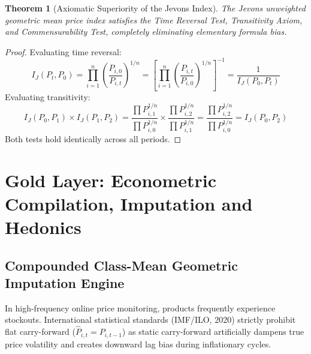 \documentclass[11pt,a4paper,oneside]{article}
\newtheorem{theorem}{Theorem}[section]
\begin{document}
\begin{theorem}[Axiomatic Superiority of the Jevons Index]
The Jevons unweighted geometric mean price index satisfies the Time Reversal Test, Transitivity Axiom, and Commensurability Test, completely eliminating elementary formula bias.
\end{theorem}

\begin{proof}
Evaluating time reversal:
\begin{equation}
I_J(P_t, P_0) = \prod_{i=1}^n \left( \frac{P_{i,0}}{P_{i,t}} \right)^{1/n} = \left[ \prod_{i=1}^n \left( \frac{P_{i,t}}{P_{i,0}} \right)^{1/n} \right]^{-1} = \frac{1}{I_J(P_0, P_t)}
\end{equation}
Evaluating transitivity:
\begin{equation}
I_J(P_0, P_1) \times I_J(P_1, P_2) = \frac{\prod P_{i,1}^{1/n}}{\prod P_{i,0}^{1/n}} \times \frac{\prod P_{i,2}^{1/n}}{\prod P_{i,1}^{1/n}} = \frac{\prod P_{i,2}^{1/n}}{\prod P_{i,0}^{1/n}} = I_J(P_0, P_2)
\end{equation}
Both tests hold identically across all periods.
\end{proof}

\newpage

\section{Gold Layer: Econometric Compilation, Imputation and Hedonics}

\subsection{Compounded Class-Mean Geometric Imputation Engine}
In high-frequency online price monitoring, products frequently experience stockouts. International statistical standards (IMF/ILO, 2020) strictly prohibit flat carry-forward ($\widehat{P}_{i, t} = P_{i, t-1}$) as static carry-forward artificially dampens true price volatility and creates downward lag bias during inflationary cycles.
\end{document}
